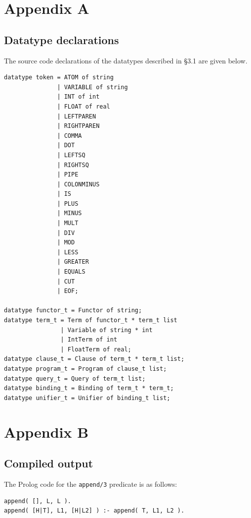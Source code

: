 \documentclass[12pt]{article}
\begin{document}
\newpage

\section*{Appendix A}

\subsection*{Datatype declarations}

The source code declarations of the datatypes described in \S3.1 are given below.

\begin{verbatim}
datatype token = ATOM of string
               | VARIABLE of string
               | INT of int
               | FLOAT of real
               | LEFTPAREN
               | RIGHTPAREN
               | COMMA
               | DOT
               | LEFTSQ
               | RIGHTSQ
               | PIPE
               | COLONMINUS
               | IS
               | PLUS
               | MINUS
               | MULT
               | DIV
               | MOD
               | LESS
               | GREATER
               | EQUALS
               | CUT
               | EOF;

datatype functor_t = Functor of string;
datatype term_t = Term of functor_t * term_t list
                | Variable of string * int
                | IntTerm of int
                | FloatTerm of real;
datatype clause_t = Clause of term_t * term_t list;
datatype program_t = Program of clause_t list;
datatype query_t = Query of term_t list;
datatype binding_t = Binding of term_t * term_t;
datatype unifier_t = Unifier of binding_t list;

\end{verbatim}

\section*{Appendix B}

\subsection*{Compiled output}

The Prolog code for the \verb|append/3| predicate is as follows:

\begin{verbatim}
append( [], L, L ).
append( [H|T], L1, [H|L2] ) :- append( T, L1, L2 ).
\end{verbatim}
\end{document}
